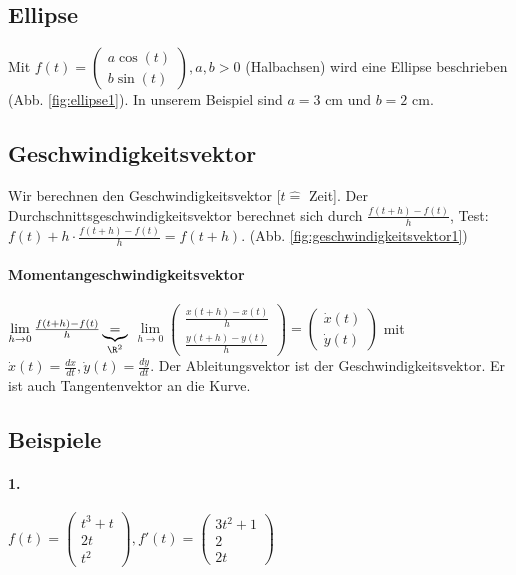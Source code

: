 \renewcommand{\ldate}{2015-10-16}

\subsection{Ellipse}
Mit $ f(t)= \left( \begin{array}{c} a \cos(t)\\ b \sin(t) \end{array} \right), a,b > 0 $ (Halbachsen) wird eine Ellipse beschrieben (Abb. \ref{fig:ellipse1}). In unserem Beispiel sind $a=3$ cm und $b=2$ cm. 

\subsection{Geschwindigkeitsvektor}
Wir berechnen den Geschwindigkeitsvektor [$t\widehat{=}$ Zeit]. Der Durchschnittsgeschwindigkeitsvektor berechnet sich durch $ \frac{f(t+h)-f(t)}{h}$, Test: $ f(t)+h\cdot \frac{f(t+h)-f(t)}{h} = f(t+h)$. (Abb. \ref{fig:geschwindigkeitsvektor1})

\paragraph{Momentangeschwindigkeitsvektor} 
$\lim\limits_{h\rightarrow 0} \frac{f(t+h)-f(t)}{h} \underbrace{=}_{\R^2} $ 
$\lim\limits_{h\rightarrow 0} \left(
\begin{array}{c}
\frac{x(t+h)-x(t)}{h}\\
\frac{y(t+h)-y(t)}{h}
\end{array}
\right) = \left( \begin{array}{c} \dot{x}(t) \\ \dot{y}(t) \end{array}\right) $ mit
$ \dot{x}(t) = \frac{dx}{dt}, \dot{y}(t) = \frac{dy}{dt} $. Der Ableitungsvektor ist der Geschwindigkeitsvektor. Er ist auch Tangentenvektor an die Kurve. 

\subsection{Beispiele}
\paragraph{1.} $ f(t) = \left( \begin{array}{c} t^3 + t\\ 2t\\t^2\end{array}\right), f'(t)= \left( \begin{array}{c} 3t^2 + 1\\2\\2t\end{array}\right)$
